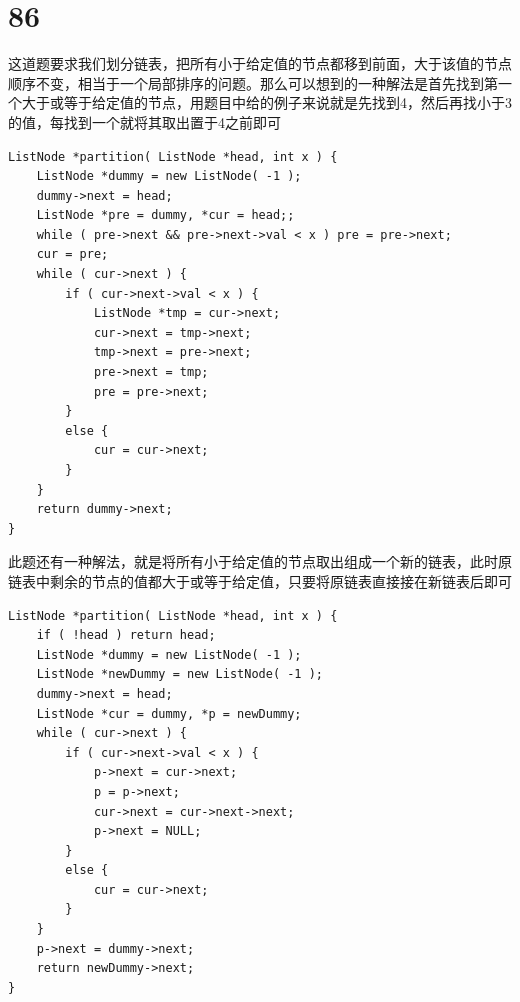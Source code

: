 \documentclass[12pt,a4paper]{article}
\begin{document}
\section{86}
\begin{CJK}{UTF8}{gbsn}
这道题要求我们划分链表，把所有小于给定值的节点都移到前面，大于该值的节点顺序不变，相当于一个局部排序的问题。那么可以想到的一种解法是首先找到第一个大于或等于给定值的节点，用题目中给的例子来说就是先找到4，然后再找小于3的值，每找到一个就将其取出置于4之前即可
\end{CJK}
\begin{lstlisting}
ListNode *partition( ListNode *head, int x ) {
	ListNode *dummy = new ListNode( -1 );
	dummy->next = head;
	ListNode *pre = dummy, *cur = head;;
	while ( pre->next && pre->next->val < x ) pre = pre->next;
	cur = pre;
	while ( cur->next ) {
		if ( cur->next->val < x ) {
			ListNode *tmp = cur->next;
			cur->next = tmp->next;
			tmp->next = pre->next;
			pre->next = tmp;
			pre = pre->next;
		}
		else {
			cur = cur->next;
		}
	}
	return dummy->next;
}
\end{lstlisting}
\begin{CJK}{UTF8}{gbsn}
此题还有一种解法，就是将所有小于给定值的节点取出组成一个新的链表，此时原链表中剩余的节点的值都大于或等于给定值，只要将原链表直接接在新链表后即可
\end{CJK}
\begin{lstlisting}
ListNode *partition( ListNode *head, int x ) {
	if ( !head ) return head;
	ListNode *dummy = new ListNode( -1 );
	ListNode *newDummy = new ListNode( -1 );
	dummy->next = head;
	ListNode *cur = dummy, *p = newDummy;
	while ( cur->next ) {
		if ( cur->next->val < x ) {
			p->next = cur->next;
			p = p->next;
			cur->next = cur->next->next;
			p->next = NULL;
		}
		else {
			cur = cur->next;
		}
	}
	p->next = dummy->next;
	return newDummy->next;
}
\end{lstlisting}
\end{document}
